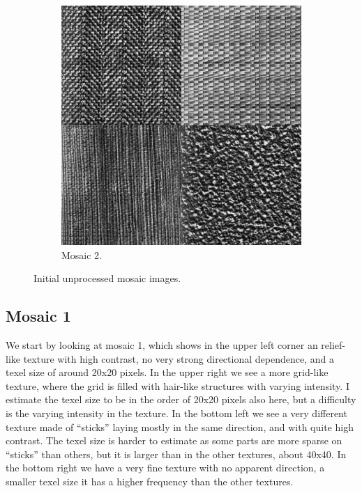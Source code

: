 \documentclass[a4paper]{article}
\begin{document}
\begin{figure}
\begin{subfigure}[b]{0.40\textwidth}
        \includegraphics[width=\textwidth]{mosaic2.png}
        \caption{%
            Mosaic 2.
        }
    \end{subfigure}
    \caption{%
        Initial unprocessed mosaic images.
    }
    \label{fig:raw_mosaic}
\end{figure}

\subsection{Mosaic 1}

We start by looking at mosaic 1, which shows in the upper left corner an
relief-like texture with high contrast, no very strong directional
dependence, and a texel size of around 20x20 pixels. In the upper right
we see a more grid-like texture, where the grid is filled with hair-like
structures with varying intensity. I estimate the texel size to be in
the order of 20x20 pixels also here, but a difficulty is the varying
intensity in the texture. In the bottom left we see a very
different texture made of ``sticks'' laying mostly in the same direction,
and with quite high contrast. The texel size is harder to estimate as
some parts are more sparse on ``sticks'' than others, but
it is larger than in the other textures, about 40x40. In the bottom
right we have a very fine texture with no apparent direction, a smaller
texel size it has a higher frequency than the other textures.
\end{document}
